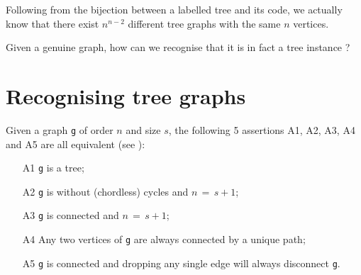 Following from the bijection between a labelled tree and its \Pruefer code, we actually know that there exist $n^{n-2}$ different tree graphs with the same $n$ vertices.

Given a genuine graph, how can we recognise that it is in fact a tree instance ?

\section{Recognising tree graphs}
\label{sec:22.2}

Given a graph \texttt{g} of order $n$ and size $s$, the following 5 assertions A1, A2, A3, A4 and A5 are all equivalent (see \citep{JPB-1991}):
\begin{itemize}
\item [A1] \texttt{g} is a tree;
\item [A2] \texttt{g} is without (chordless) cycles and $n \,=\, s + 1$;
\item [A3] \texttt{g} is connected and $n \,=\, s + 1$;
\item [A4] Any two vertices of \texttt{g} are always connected by a unique path;
\item [A5] \texttt{g} is connected and dropping any single edge will always disconnect \texttt{g}.
\end{itemize}

